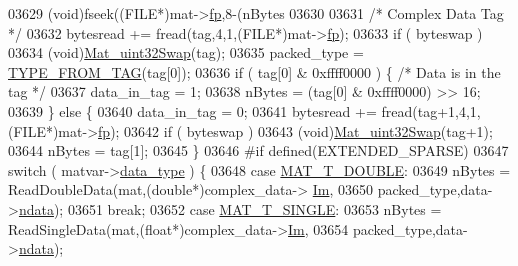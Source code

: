 \begin{DoxyCode}
{{{{{{{{{{{{{{{{{{03629                         (void)fseek((FILE*)mat->\hyperlink{struct__mat__t_a85f562e407ca9ad4d2a6e14f839432b7}{fp},8-(nBytes %
03630 
03631                     \textcolor{comment}{/* Complex Data Tag */}
03632                     bytesread += fread(tag,4,1,(FILE*)mat->\hyperlink{struct__mat__t_a85f562e407ca9ad4d2a6e14f839432b7}{fp});
03633                     \textcolor{keywordflow}{if} ( byteswap )
03634                         (void)\hyperlink{endian_8c_a8cb0d0750e2eaf9840d95db531934f4f}{Mat\_uint32Swap}(tag);
03635                     packed\_type = \hyperlink{mat5_8c_a82bacecc4afc633b61bc3dc8ef88d1ed}{TYPE\_FROM\_TAG}(tag[0]);
03636                     \textcolor{keywordflow}{if} ( tag[0] & 0xffff0000 ) \{ \textcolor{comment}{/* Data is in the tag */}
03637                         data\_in\_tag = 1;
03638                         nBytes = (tag[0] & 0xffff0000) >> 16;
03639                     \} \textcolor{keywordflow}{else} \{
03640                         data\_in\_tag = 0;
03641                         bytesread += fread(tag+1,4,1,(FILE*)mat->\hyperlink{struct__mat__t_a85f562e407ca9ad4d2a6e14f839432b7}{fp});
03642                         \textcolor{keywordflow}{if} ( byteswap )
03643                             (void)\hyperlink{endian_8c_a8cb0d0750e2eaf9840d95db531934f4f}{Mat\_uint32Swap}(tag+1);
03644                         nBytes = tag[1];
03645                     \}
03646 \textcolor{preprocessor}{#if defined(EXTENDED\_SPARSE)}
03647                     \textcolor{keywordflow}{switch} ( matvar->\hyperlink{group___m_a_t_ab6aafe9bd77f0f077852593dec438144}{data\_type} ) \{
03648                         \textcolor{keywordflow}{case} \hyperlink{group___m_a_t_ggacf7b3b879282b7ab3a51190e49bf3453a31e721ecf7e188196f83c32838288797}{MAT\_T\_DOUBLE}:
03649                             nBytes = ReadDoubleData(mat,(\textcolor{keywordtype}{double}*)complex\_data->
      \hyperlink{group___m_a_t_a7182d10b0d3598415887376065440946}{Im},
03650                                 packed\_type,data->\hyperlink{group___m_a_t_a1beb8a8c58a808207cbea650563a9b63}{ndata});
03651                             \textcolor{keywordflow}{break};
03652                         \textcolor{keywordflow}{case} \hyperlink{group___m_a_t_ggacf7b3b879282b7ab3a51190e49bf3453a3a3657d40e9212c923d9b9d03531b64c}{MAT\_T\_SINGLE}:
03653                             nBytes = ReadSingleData(mat,(\textcolor{keywordtype}{float}*)complex\_data->\hyperlink{group___m_a_t_a7182d10b0d3598415887376065440946}{Im},
03654                                 packed\_type,data->\hyperlink{group___m_a_t_a1beb8a8c58a808207cbea650563a9b63}{ndata});
}}}}}}}}}}}}}}}}}}
\end{DoxyCode}
